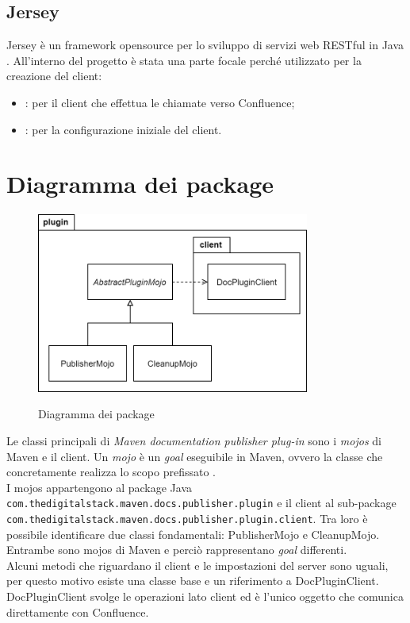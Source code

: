 \subsection{Jersey} %
Jersey è un framework opensource per lo sviluppo di servizi web RESTful in Java \cite{site:jersey}.
All'interno del progetto è stata una parte focale perché utilizzato per la creazione del client:
\begin{itemize}
    \item {}: per il client che effettua le chiamate verso Confluence;
    \item {}: per la configurazione iniziale del client.
\end{itemize}

\clearpage

\section{Diagramma dei package}
\label{sec:diagramma-package}
\begin{figure}[H]
    \centering
    \includegraphics[width=0.8\textwidth]{immagini/PackageDiagram.png}\\
    \caption{Diagramma dei package}
\end{figure}
Le classi principali di \emph{Maven documentation publisher plug-in} sono i \emph{mojos} di Maven e il client.
Un \emph{mojo} è un \emph{goal} eseguibile in Maven, ovvero la classe che concretamente realizza lo scopo prefissato \cite{site:maven-mojo}. \\
I mojos appartengono al package Java \\ \texttt{com.thedigitalstack.maven.docs.publisher.plugin} e il client al sub-package\\ \texttt{com.thedigitalstack.maven.docs.publisher.plugin.client}.
Tra loro è possibile identificare due classi fondamentali: PublisherMojo e CleanupMojo.
Entrambe sono mojos di Maven e perciò rappresentano \emph{goal} differenti. \\
Alcuni metodi che riguardano il client e le impostazioni del server sono uguali, per questo motivo esiste una classe base e un riferimento a DocPluginClient.
DocPluginClient svolge le operazioni lato client ed è l'unico oggetto che comunica direttamente con Confluence.

